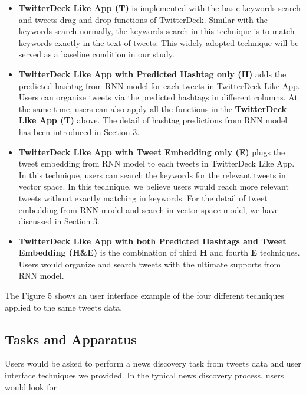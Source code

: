 \begin{itemize}
  \item \textbf{TwitterDeck Like App (T)} is implemented with the basic keywords search and tweets drag-and-drop functions of TwitterDeck. Similar with the keywords search normally, the keywords search in this technique is to match keywords exactly in the text of tweets. This widely adopted technique will be served as a baseline condition in our study. 
  
  \item \textbf{TwitterDeck Like App with Predicted Hashtag only (H)} adds the predicted hashtag from RNN model for each tweets in TwitterDeck Like App. Users can organize tweets via the predicted hashtags in different columns. At the same time, users can also apply all the functions in the \textbf{TwitterDeck Like App (T)} above. The detail of hashtag predictions from RNN model has been introduced in Section 3. 

  \item \textbf{TwitterDeck Like App with Tweet Embedding only (E)} plugs the tweet embedding from RNN model to each tweets in TwitterDeck Like App. In this technique, users can search the keywords for the relevant tweets in vector space. In this technique, we believe users would reach more relevant tweets without exactly matching in keywords. For the detail of tweet embedding from RNN model and search in vector space model, we have discussed in Section 3.   
  
  \item \textbf{TwitterDeck Like App with both Predicted Hashtags and Tweet Embedding (H\&E)} is the combination of third \textbf{H} and fourth \textbf{E} techniques. Users would organize and search tweets with the ultimate supports from RNN model. 
  
\end{itemize}

The Figure 5 shows an user interface example of the four different techniques applied to the same tweets data. 

\subsection{Tasks and Apparatus}

Users would be asked to perform a news discovery task from tweets data and user interface techniques we provided. In the typical news discovery process, users would look for 



